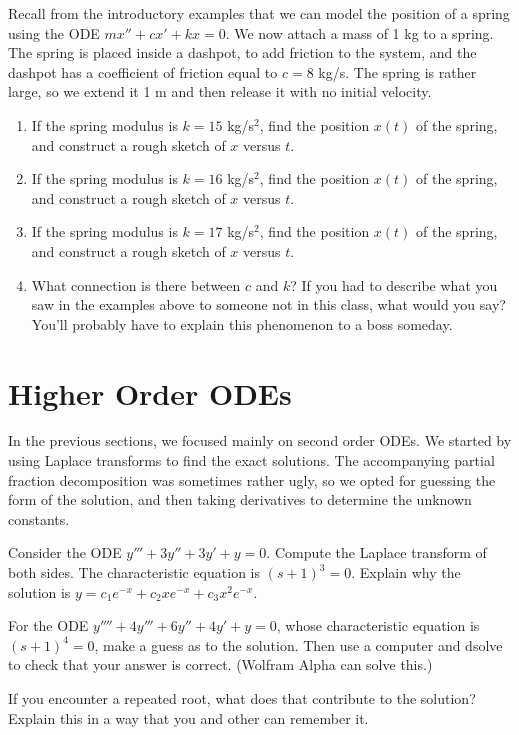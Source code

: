 \begin{problem}
 Recall from the introductory examples that we can model the position of a spring using the ODE $mx''+cx'+kx=0$. 
 We now attach a mass of 1 kg to a spring. The spring is placed inside a dashpot, to add friction to the system, and the dashpot has a coefficient of friction equal to $c=8$ kg/s. The spring is rather large, so we extend it 1 m and then release it with no initial velocity. 
\begin{enumerate}
 \item If the spring modulus is $k=15$ kg/s$^2$, find the position $x(t)$ of the spring, and construct a rough sketch of $x$ versus $t$.  
 \item If the spring modulus is $k=16$ kg/s$^2$, find the position $x(t)$ of the spring, and construct a rough sketch of $x$ versus $t$.  
 \item If the spring modulus is $k=17$ kg/s$^2$, find the position $x(t)$ of the spring, and construct a rough sketch of $x$ versus $t$.  
 \item What connection is there between $c$ and $k$? If you had to describe what you saw in the examples above to someone not in this class, what would you say?  You'll probably have to explain this phenomenon to a boss someday. 
\end{enumerate}
\end{problem}



\section{Higher Order ODEs}
In the previous sections, we focused mainly on second order ODEs.  We started by using Laplace transforms to find the exact solutions.  The accompanying partial fraction decomposition was sometimes rather ugly, so we opted for guessing the form of the solution, and then taking derivatives to determine the unknown constants. 

\begin{problem}
 Consider the ODE $y'''+3y''+3y'+y=0$.  Compute the Laplace transform of both sides.  The characteristic equation is $(s+1)^3=0$. Explain why the solution is $y = c_1 e^{-x}+c_2 x e^{-x}+c_3 x^2e^{-x}.$ 

 For the ODE $y''''+4y'''+6y''+4y'+y=0$, whose characteristic equation is $(s+1)^4=0$, make a guess as to the solution. Then use a computer and dsolve to check that your answer is correct. (Wolfram Alpha can solve this.)

 If you encounter a repeated root, what does that contribute to the solution? Explain this in a way that you and other can remember it.
\end{problem}

